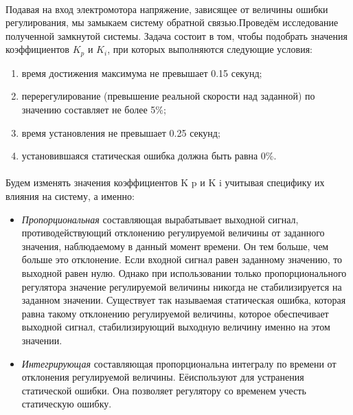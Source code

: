 \documentclass[12pt]{article}
\begin{document}
\paragraph{}
Подавая на вход электромотора напряжение, зависящее от
величины ошибки регулирования, мы замыкаем систему
обратной связью.Проведём исследование полученной замкнутой системы.
Задача состоит в том, чтобы подобрать значения
коэффициентов $K_p$ и $K_i$, при которых выполняются следующие условия:
\begin{enumerate}
	\item время достижения максимума не превышает 0.15 секунд;
	\item перерегулирование (превышение реальной скорости над заданной) по значению составляет не более 5\%;
	\item время установления не превышает 0.25 секунд;
	\item установившаяся статическая ошибка должна быть равна 0\%.
\end{enumerate}
\paragraph{}
Будем изменять значения коэффициентов K p и K i учитывая
специфику их влияния на систему, а именно:
\begin{itemize}
	\item \textit{Пропорциональная} составляющая вырабатывает выходной
сигнал, противодействующий отклонению регулируемой
величины от заданного значения, наблюдаемому в данный
момент времени. Он тем больше, чем больше это отклонение.
Если входной сигнал равен заданному значению, то выходной
равен нулю. Однако при использовании только
пропорционального регулятора значение регулируемой
величины никогда не стабилизируется на заданном
значении. Существует так называемая статическая ошибка,
которая равна такому отклонению регулируемой величины,
которое обеспечивает выходной сигнал, стабилизирующий
выходную величину именно на этом значении.
\item \textit{Интегрирующая} составляющая пропорциональна интегралу
по времени от отклонения регулируемой величины. Еёиспользуют для устранения статической ошибки. Она
позволяет регулятору со временем учесть статическую
ошибку.
\end{itemize}
\end{document}
